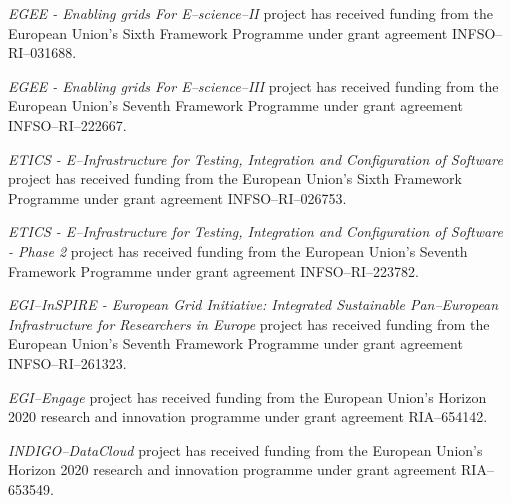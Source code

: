 {\sl EGEE - Enabling grids For E--science--II} project has received funding from the
European Union's Sixth Framework Programme under grant agreement INFSO--RI--031688.

{\sl EGEE - Enabling grids For E--science--III} project has received funding from the
European Union's Seventh Framework Programme under grant agreement INFSO--RI--222667.

{\sl ETICS - E--Infrastructure for Testing, Integration and Configuration of Software}
project has received funding from the European Union's Sixth Framework Programme under
grant agreement INFSO--RI--026753.

{\sl ETICS - E--Infrastructure for Testing, Integration and Configuration of Software - Phase 2}
project has received funding from the European Union's Seventh Framework Programme under grant
agreement INFSO--RI--223782.

{\sl EGI--InSPIRE - European Grid Initiative: Integrated Sustainable Pan--European
Infrastructure for Researchers in Europe} project has received funding from the European
Union's Seventh Framework Programme under grant agreement INFSO--RI--261323.

{\sl EGI--Engage} project has received funding from the European Union's Horizon 2020
research and innovation programme under grant agreement RIA--654142.

{\sl INDIGO--DataCloud} project has received funding from the European Union's Horizon
2020 research and innovation programme under grant agreement RIA--653549.

